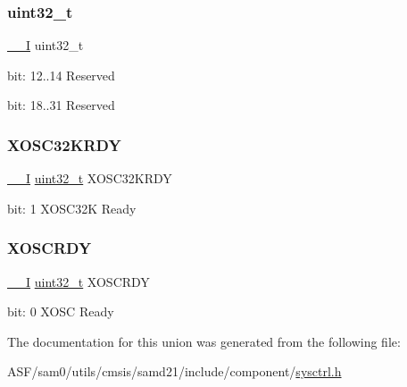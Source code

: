 \subsubsection{\texorpdfstring{uint32\_t}{uint32\_t}}
{\footnotesize\ttfamily \mbox{\hyperlink{core__cm0plus_8h_af63697ed9952cc71e1225efe205f6cd3}{\+\_\+\+\_\+I}} uint32\+\_\+t}

bit\+: 12..14 Reserved

bit\+: 18..31 Reserved \mbox{\label{union_s_y_s_c_t_r_l___i_n_t_f_l_a_g___type_ae11e5e790a7928746b574e5f9538107f}} 
\subsubsection{\texorpdfstring{XOSC32KRDY}{XOSC32KRDY}}
{\footnotesize\ttfamily \mbox{\hyperlink{core__cm0plus_8h_af63697ed9952cc71e1225efe205f6cd3}{\+\_\+\+\_\+I}} \mbox{\hyperlink{union_s_y_s_c_t_r_l___i_n_t_f_l_a_g___type_a7c2ec0f7b3f1314bdede58b182af397c}{uint32\+\_\+t}} X\+O\+S\+C32\+K\+R\+DY}

bit\+: 1 X\+O\+S\+C32K Ready \mbox{\label{union_s_y_s_c_t_r_l___i_n_t_f_l_a_g___type_a9aa97074ed30a2f0ac649d8528d5d678}} 
\subsubsection{\texorpdfstring{XOSCRDY}{XOSCRDY}}
{\footnotesize\ttfamily \mbox{\hyperlink{core__cm0plus_8h_af63697ed9952cc71e1225efe205f6cd3}{\+\_\+\+\_\+I}} \mbox{\hyperlink{union_s_y_s_c_t_r_l___i_n_t_f_l_a_g___type_a7c2ec0f7b3f1314bdede58b182af397c}{uint32\+\_\+t}} X\+O\+S\+C\+R\+DY}

bit\+: 0 X\+O\+SC Ready 

The documentation for this union was generated from the following file\+:\begin{DoxyCompactItemize}
\item 
A\+S\+F/sam0/utils/cmsis/samd21/include/component/\mbox{\hyperlink{component_2sysctrl_8h}{sysctrl.\+h}}\end{DoxyCompactItemize}
